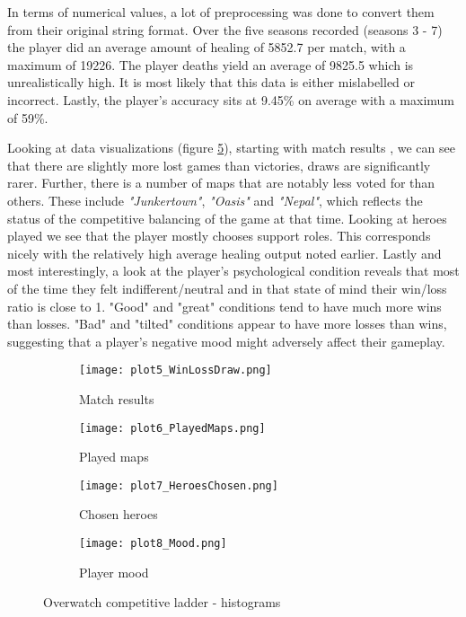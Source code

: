 \documentclass{article}
\begin{document}
In terms of numerical values, a lot of preprocessing was done to convert them from their original string format.
Over the five seasons recorded (seasons 3 - 7) the player did an average amount of healing of 5852.7 per match, with a maximum of 19226.
The player deaths yield an average of 9825.5 which is unrealistically high.
It is most likely that this data is either mislabelled or incorrect.
Lastly, the player's accuracy sits at 9.45\% on average with a maximum of 59\%.

Looking at data visualizations (figure \ref{fig:oclh}), starting with match results , we can see that there are slightly more lost games than victories, draws are significantly rarer.
Further, there is a number of maps that are notably less voted for than others.
These include \textit{"Junkertown"}, \textit{"Oasis"} and \textit{"Nepal"}, which reflects the status of the competitive balancing of the game at that time.
Looking at heroes played we see that the player mostly chooses support roles.
This corresponds nicely with the relatively high average healing output noted earlier.
Lastly and most interestingly, a look at the player's psychological condition reveals that most of the time they felt indifferent/neutral and in that state of mind their win/loss ratio is close to 1.
"Good" and "great" conditions tend to have much more wins than losses.
"Bad" and "tilted" conditions appear to have more losses than wins, suggesting that a player's negative mood might adversely affect their gameplay.

\begin{figure}[h]
\centering
\begin{subfigure}[b]{0.45\textwidth}
\texttt{[image: plot5\_WinLossDraw.png]}
\caption{Match results}
\label{fig:ma_re}
\end{subfigure}
\begin{subfigure}[b]{0.45\textwidth}
\texttt{[image: plot6\_PlayedMaps.png]}
\caption{Played maps}
\label{fig:pl_ma}
\end{subfigure}
    
\begin{subfigure}[b]{0.45\textwidth}
\texttt{[image: plot7\_HeroesChosen.png]}
\caption{Chosen heroes}
\label{fig:ch_he}
\end{subfigure}
\begin{subfigure}[b]{0.45\textwidth}
\texttt{[image: plot8\_Mood.png]}
\caption{Player mood}
\label{fig:pl_mo}
\end{subfigure}
\caption{Overwatch competitive ladder - histograms}\label{fig:oclh}
\end{figure}
\end{document}
